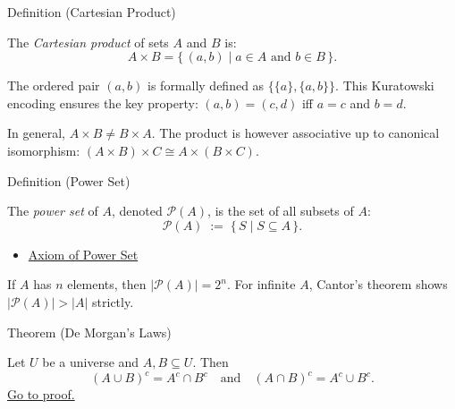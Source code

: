 \begin{definitionbox}{Definition (Cartesian Product)}
\begin{definition}\label{def:cartesian-product}
The \emph{Cartesian product} of sets $A$ and $B$ is:
\[
A \times B = \{\, (a,b) \mid a \in A \text{ and } b \in B \,\}.
\]
\end{definition}
\end{definitionbox}

\begin{remark*}
The ordered pair $(a,b)$ is formally defined as $\{\{a\},\{a,b\}\}$.
This Kuratowski encoding ensures the key property: $(a,b) = (c,d)$ iff
$a = c$ and $b = d$.
\end{remark*}

\begin{remark*}
In general, $A \times B \neq B \times A$. The product is however associative
up to canonical isomorphism: $(A \times B) \times C \cong A \times (B \times C)$.
\end{remark*}

\begin{definitionbox}{Definition (Power Set)}
\begin{definition}\label{def:power-set}
The \emph{power set} of $A$, denoted $\mathcal{P}(A)$, is the set of all
subsets of $A$:
\[
\mathcal{P}(A) \;:=\; \{\, S \mid S \subseteq A \,\}.
\]
\end{definition}
\end{definitionbox}


\begin{dependencies}
\begin{itemize}
  \item \hyperref[ax:power-set]{Axiom of Power Set}
\end{itemize}
\end{dependencies}

\begin{remark*}[Size]
If $A$ has $n$ elements, then $|\mathcal{P}(A)| = 2^n$. For infinite $A$,
Cantor's theorem shows $|\mathcal{P}(A)| > |A|$ strictly.
\end{remark*}

\begin{theorembox}{Theorem (De Morgan's Laws)}
\begin{theorem}\label{thm:de-morgan}
Let $U$ be a universe and $A,B \subseteq U$. Then
\[
(A \cup B)^c = A^c \cap B^c
\quad\text{and}\quad
(A \cap B)^c = A^c \cup B^c.
\]
\hyperref[prf:de-morgan]{Go to proof.}
\end{theorem}
\end{theorembox}

